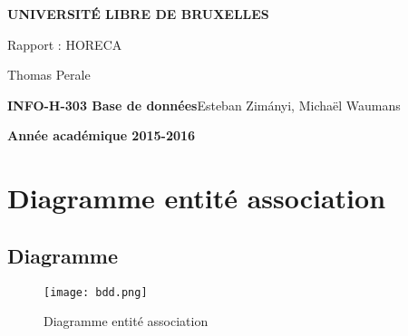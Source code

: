 \documentclass[a4paper,10pt]{article}
\begin{document}
\begin{titlepage}
\begin{center}
\textbf{\textsc{UNIVERSIT\'E LIBRE DE BRUXELLES}}\\
\vfill{}\vfill{}
\begin{center}{\Huge Rapport : HORECA}\end{center}{\Huge \par}
\begin{center}{\large Thomas Perale}\end{center}{\Huge \par}
\vfill{}\vfill{} \vfill{}
\begin{flushleft}{\large \textbf{INFO-H-303 Base de données}}\hfill{Esteban Zimányi, Michaël Waumans}\end{flushleft}{\large\par}
\vfill{}\vfill{}\enlargethispage{3cm}
\textbf{Année académique 2015-2016}
\end{center}
\end{titlepage}



\tableofcontents

\pagebreak


\section{Diagramme entité association}
\subsection{Diagramme}
\begin{figure}[hbt]
  \texttt{[image: bdd.png]}
  \caption{Diagramme entité association
}
\end{figure}
\end{document}
